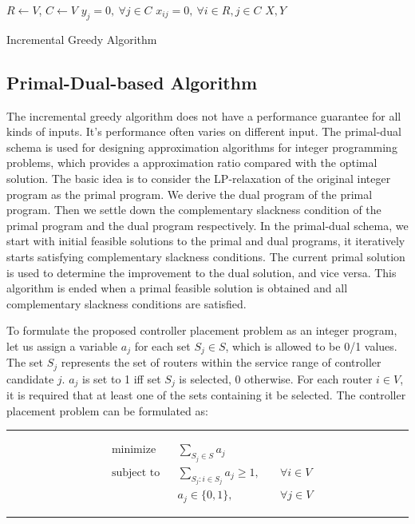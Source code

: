 \documentclass[conference]{IEEEtran}
\begin{document}
\begin{algorithm}[!htbp]
\BlankLine
$R\leftarrow V$, $C\leftarrow V$ \;
$y_j=0, \ \forall j\in C$ \;
$x_{ij}=0, \ \forall i\in R, j\in C$ \;
\Return $X, Y$
\caption{Incremental Greedy Algorithm}
\label{alg:naive}
\end{algorithm}

\subsection{Primal-Dual-based Algorithm}

The incremental greedy algorithm does not have a performance guarantee for all kinds of inputs. It's performance often varies on different input. The primal-dual schema is used for designing approximation algorithms for integer programming problems, which provides a approximation ratio compared with the optimal solution. The basic idea is to consider the LP-relaxation of the original integer program as the primal program. We derive the dual program of the primal program. Then we settle down the complementary slackness condition of the primal program and the dual program respectively. In the primal-dual schema, we start with initial feasible solutions to the primal and dual programs, it iteratively starts satisfying complementary slackness conditions. The current primal solution is used to determine the improvement to the dual solution, and vice versa. This algorithm is ended when a primal feasible solution is obtained and all complementary slackness conditions are satisfied.

To formulate the proposed controller placement problem as an integer program, let us assign a variable $a_j$ for each set $S_j\in S$, which is allowed to be 0/1 values. The set $S_j$ represents the set of routers within the service range of controller candidate $j$. $a_j$ is set to 1 iff set $S_j$ is selected, 0 otherwise. For each router $i\in V$, it is required that at least one of the sets containing it be selected. The controller placement problem can be formulated as:
\rule{0.5\textwidth}{0.5pt}
\begin{equation}
\begin{aligned}
& \text{minimize} & & \sum_{S_j\in S}a_j \\
& \text{subject to} & &  \sum_{S_j: i\in S_j}a_j \ge 1, \quad & \forall i\in V \\
& & & a_j\in \{0,1\}, \quad & \forall j\in V
\end{aligned}
\end{equation}
\rule{0.5\textwidth}{0.5pt}
\end{document}

